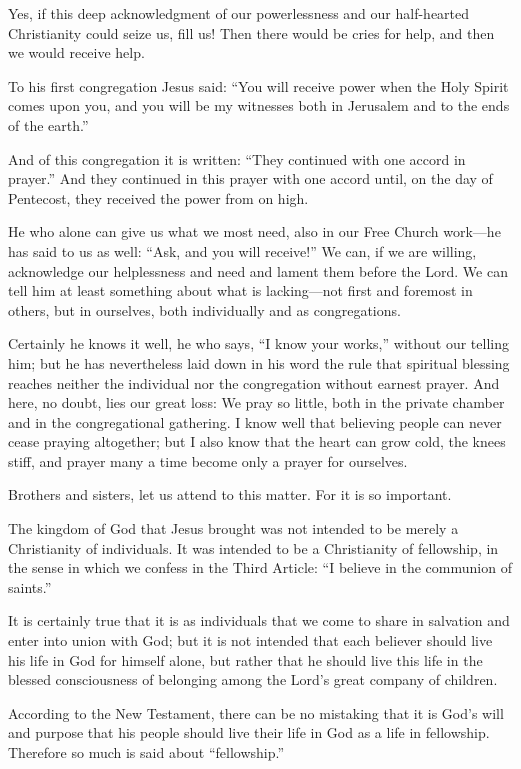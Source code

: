 Yes, if this deep acknowledgment of our powerlessness and our half-hearted Christianity could seize us, fill us! Then there would be cries for help, and then we would receive help.

To his first congregation Jesus said: “You will receive power when the Holy Spirit comes upon you, and you will be my witnesses both in Jerusalem and to the ends of the earth.”

And of this congregation it is written: “They continued with one accord in prayer.” And they continued in this prayer with one accord until, on the day of Pentecost, they received the power from on high.

He who alone can give us what we most need, also in our Free Church work—he has said to us as well: “Ask, and you will receive!” We can, if we are willing, acknowledge our helplessness and need and lament them before the Lord. We can tell him at least something about what is lacking—not first and foremost in others, but in ourselves, both individually and as congregations.

Certainly he knows it well, he who says, “I know your works,” without our telling him; but he has nevertheless laid down in his word the rule that spiritual blessing reaches neither the individual nor the congregation without earnest prayer. And here, no doubt, lies our great loss: We pray so little, both in the private chamber and in the congregational gathering. I know well that believing people can never cease praying altogether; but I also know that the heart can grow cold, the knees stiff, and prayer many a time become only a prayer for ourselves.

Brothers and sisters, let us attend to this matter. For it is so important.

The kingdom of God that Jesus brought was not intended to be merely a Christianity of individuals. It was intended to be a Christianity of fellowship, in the sense in which we confess in the Third Article: “I believe in the communion of saints.”

It is certainly true that it is as individuals that we come to share in salvation and enter into union with God; but it is not intended that each believer should live his life in God for himself alone, but rather that he should live this life in the blessed consciousness of belonging among the Lord’s great company of children.

According to the New Testament, there can be no mistaking that it is God’s will and purpose that his people should live their life in God as a life in fellowship. Therefore so much is said about “fellowship.”

